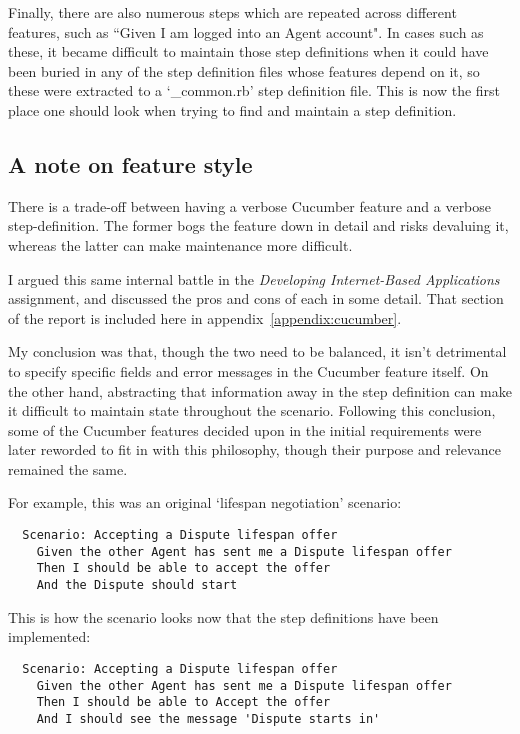 Finally, there are also numerous steps which are repeated across different features, such as ``Given I am logged into an Agent account". In cases such as these, it became difficult to maintain those step definitions when it could have been buried in any of the step definition files whose features depend on it, so these were extracted to a `\_common.rb' step definition file. This is now the first place one should look when trying to find and maintain a step definition.

\subsection{A note on feature style}

There is a trade-off between having a verbose Cucumber feature and a verbose step-definition. The former bogs the feature down in detail and risks devaluing it, whereas the latter can make maintenance more difficult.

I argued this same internal battle in the \emph{Developing Internet-Based Applications} assignment, and discussed the pros and cons of each in some detail. That section of the report is included here in appendix~\ref{appendix:cucumber}.

My conclusion was that, though the two need to be balanced, it isn't detrimental to specify specific fields and error messages in the Cucumber feature itself. On the other hand, abstracting that information away in the step definition can make it difficult to maintain state throughout the scenario. Following this conclusion, some of the Cucumber features decided upon in the initial requirements were later reworded to fit in with this philosophy, though their purpose and relevance remained the same.

For example, this was an original `lifespan negotiation' scenario:

\begin{lstlisting}
  Scenario: Accepting a Dispute lifespan offer
    Given the other Agent has sent me a Dispute lifespan offer
    Then I should be able to accept the offer
    And the Dispute should start
\end{lstlisting}

This is how the scenario looks now that the step definitions have been implemented:

\begin{lstlisting}
  Scenario: Accepting a Dispute lifespan offer
    Given the other Agent has sent me a Dispute lifespan offer
    Then I should be able to Accept the offer
    And I should see the message 'Dispute starts in'
\end{lstlisting}

